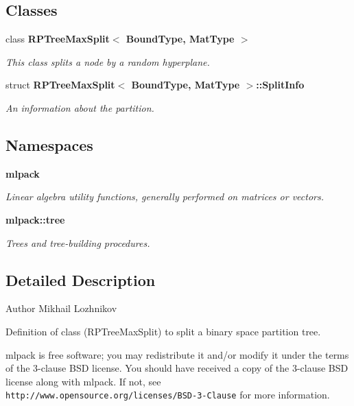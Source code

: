 \subsection*{Classes}
\begin{DoxyCompactItemize}
\item 
class \textbf{ R\+P\+Tree\+Max\+Split$<$ Bound\+Type, Mat\+Type $>$}
\begin{DoxyCompactList}\small\item\em This class splits a node by a random hyperplane. \end{DoxyCompactList}\item 
struct \textbf{ R\+P\+Tree\+Max\+Split$<$ Bound\+Type, Mat\+Type $>$\+::\+Split\+Info}
\begin{DoxyCompactList}\small\item\em An information about the partition. \end{DoxyCompactList}\end{DoxyCompactItemize}
\subsection*{Namespaces}
\begin{DoxyCompactItemize}
\item 
 \textbf{ mlpack}
\begin{DoxyCompactList}\small\item\em Linear algebra utility functions, generally performed on matrices or vectors. \end{DoxyCompactList}\item 
 \textbf{ mlpack\+::tree}
\begin{DoxyCompactList}\small\item\em Trees and tree-\/building procedures. \end{DoxyCompactList}\end{DoxyCompactItemize}


\subsection{Detailed Description}
\begin{DoxyAuthor}{Author}
Mikhail Lozhnikov
\end{DoxyAuthor}
Definition of class (R\+P\+Tree\+Max\+Split) to split a binary space partition tree.

mlpack is free software; you may redistribute it and/or modify it under the terms of the 3-\/clause B\+SD license. You should have received a copy of the 3-\/clause B\+SD license along with mlpack. If not, see {\tt http\+://www.\+opensource.\+org/licenses/\+B\+S\+D-\/3-\/\+Clause} for more information. 